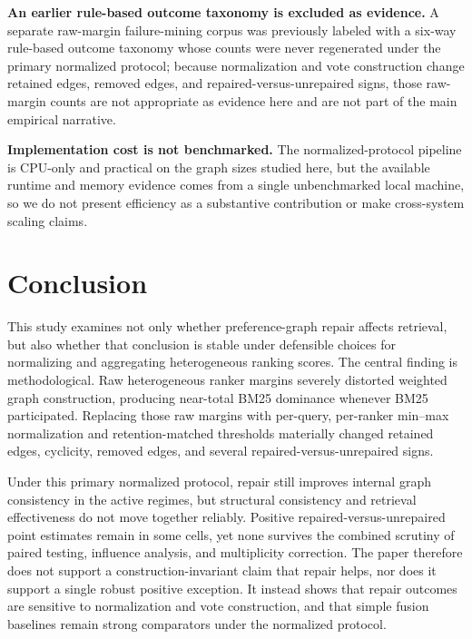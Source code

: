 \documentclass[manuscript,anonymous,review]{acmart}
\begin{document}
\textbf{An earlier rule-based outcome taxonomy is excluded as evidence.} A
separate raw-margin failure-mining corpus was previously labeled with a
six-way rule-based outcome taxonomy whose counts were never regenerated under
the primary normalized protocol; because normalization and vote construction
change retained edges, removed edges, and repaired-versus-unrepaired signs,
those raw-margin counts are not appropriate as evidence here and are not part
of the main empirical narrative.

\textbf{Implementation cost is not benchmarked.} The normalized-protocol
pipeline is CPU-only and practical on the graph sizes studied here, but the
available runtime and memory evidence comes from a single unbenchmarked local
machine, so we do not present efficiency as a substantive contribution or make
cross-system scaling claims.

\section{Conclusion}
\label{sec:conclusion}

This study examines not only whether preference-graph repair affects retrieval,
but also whether that conclusion is stable under defensible choices for
normalizing and aggregating heterogeneous ranking scores. The central finding is
methodological. Raw heterogeneous ranker margins severely distorted weighted
graph construction, producing near-total BM25 dominance whenever BM25
participated. Replacing those raw margins with per-query, per-ranker min--max
normalization and retention-matched thresholds materially changed retained
edges, cyclicity, removed edges, and several repaired-versus-unrepaired signs.

Under this primary normalized protocol, repair still improves internal graph
consistency in the active regimes, but structural consistency and retrieval
effectiveness do not move together reliably. Positive repaired-versus-unrepaired
point estimates remain in some cells, yet none survives the combined scrutiny
of paired testing, influence analysis, and multiplicity correction. The paper
therefore does not support a construction-invariant claim that repair helps, nor
does it support a single robust positive exception. It instead shows that
repair outcomes are sensitive to normalization and vote construction, and that
simple fusion baselines remain strong comparators under the normalized
protocol.
\end{document}

